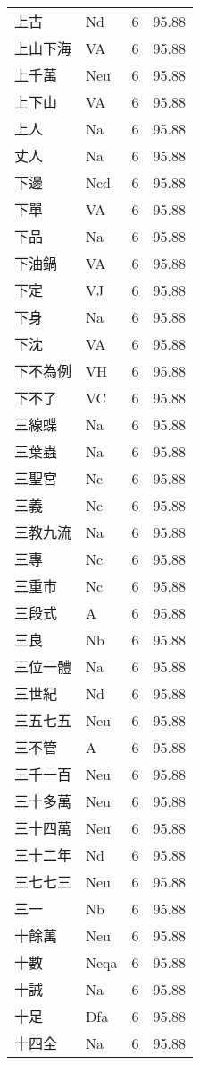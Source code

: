 \documentclass[twocolumn]{book}
\begin{document}
\begin{supertabular}{llrr}
上古 & Nd & 6 &  95.88\\
上山下海 & VA & 6 &  95.88\\
上千萬 & Neu & 6 &  95.88\\
上下山 & VA & 6 &  95.88\\
上人 & Na & 6 &  95.88\\
丈人 & Na & 6 &  95.88\\
下邊 & Ncd & 6 &  95.88\\
下單 & VA & 6 &  95.88\\
下品 & Na & 6 &  95.88\\
下油鍋 & VA & 6 &  95.88\\
下定 & VJ & 6 &  95.88\\
下身 & Na & 6 &  95.88\\
下沈 & VA & 6 &  95.88\\
下不為例 & VH & 6 &  95.88\\
下不了 & VC & 6 &  95.88\\
三線蝶 & Na & 6 &  95.88\\
三葉蟲 & Na & 6 &  95.88\\
三聖宮 & Nc & 6 &  95.88\\
三義 & Nc & 6 &  95.88\\
三教九流 & Na & 6 &  95.88\\
三專 & Nc & 6 &  95.88\\
三重市 & Nc & 6 &  95.88\\
三段式 & A & 6 &  95.88\\
三良 & Nb & 6 &  95.88\\
三位一體 & Na & 6 &  95.88\\
三世紀 & Nd & 6 &  95.88\\
三五七五 & Neu & 6 &  95.88\\
三不管 & A & 6 &  95.88\\
三千一百 & Neu & 6 &  95.88\\
三十多萬 & Neu & 6 &  95.88\\
三十四萬 & Neu & 6 &  95.88\\
三十二年 & Nd & 6 &  95.88\\
三七七三 & Neu & 6 &  95.88\\
三一 & Nb & 6 &  95.88\\
十餘萬 & Neu & 6 &  95.88\\
十數 & Neqa & 6 &  95.88\\
十誡 & Na & 6 &  95.88\\
十足 & Dfa & 6 &  95.88\\
十四全 & Na & 6 &  95.88\\

\end{supertabular}
\end{document}

